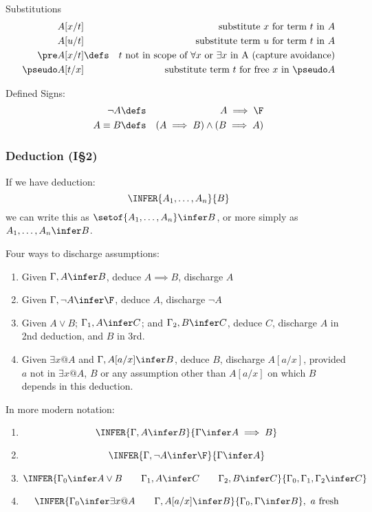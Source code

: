 Substitutions
\begin{eqnarray*}
   A[x/t] && \mbox{substitute $x$ for term $t$ in $A$}
\\ A[u/t] && \mbox{substitute term $u$ for term $t$ in $A$}
\\ \pre A[x/t]
  &\defs&
  \mbox{$t$ not in scope of $\forall x$ or $\exists x$ in A (capture avoidance)}
\\ \pseudo A[t/x] && \mbox{substitute term $t$ for free $x$ in $\pseudo A$}
\end{eqnarray*}

Defined Signs:
\begin{eqnarray*}
   \lnot A &\defs& A \implies \F
\\ A \equiv B &\defs& (A \implies B) \land (B \implies A)
\end{eqnarray*}

\newpage
\subsubsection{Deduction (I\S2)}

If we have deduction:
$$
\INFER{A_1, \ldots ,A_n}{B}
$$
we can write this as $\setof{A_1,\ldots,A_n} \infer B$,
or more simply as $A_1, \ldots , A_n \infer B$.

Four ways to discharge assumptions:
\begin{enumerate}
  \item Given $\Gamma,A \infer B$, deduce $A \implies B$, discharge  $A$
  \item Given $\Gamma,\lnot A \infer \F$, deduce $A$, discharge $\lnot A$
  \item Given $A \lor B$; $\Gamma_1,A \infer C$; and $\Gamma_2,B \infer C$,
        deduce $C$, discharge $A$ in 2nd deduction, and $B$ in 3rd.
  \item Given $\exists x @ A$ and $\Gamma,A[a/x] \infer B$,
        deduce $B$, discharge $A[a/x]$,
        provided $a$ not in $\exists x @ A$, $B$ or any assumption
        other than $A[a/x]$ on which $B$ depends in this deduction.
\end{enumerate}
In more modern notation:
\begin{enumerate}
  \item $$\INFER{\Gamma,A \infer B}{\Gamma \infer A \implies B}$$
  \item $$\INFER{\Gamma,\lnot A \infer \F}{\Gamma \infer A}$$
  \item $$\INFER{\Gamma_0 \infer A \lor B \qquad \Gamma_1,A \infer C \qquad \Gamma_2,B \infer C}{\Gamma_0,\Gamma_1,\Gamma_2 \infer C}$$
  \item $$\INFER{\Gamma_0 \infer \exists x @ A \qquad \Gamma,A[a/x] \infer B}{\Gamma_0,\Gamma \infer B},~a \mbox{ fresh}$$
\end{enumerate}

